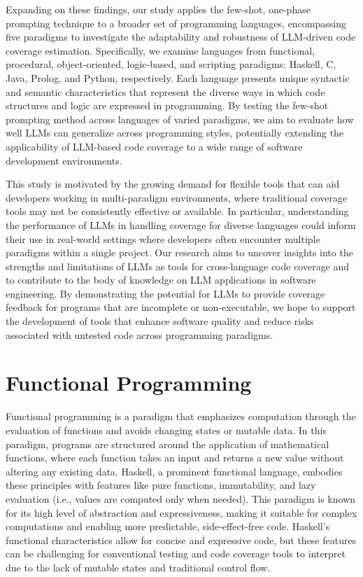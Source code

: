 \documentclass[sigconf]{acmart}
\begin{document}
Expanding on these findings, our study applies the few-shot, one-phase prompting technique to a broader set of programming languages, encompassing five paradigms to investigate the adaptability and robustness of LLM-driven code coverage estimation. Specifically, we examine languages from functional, procedural, object-oriented, logic-based, and scripting paradigms: Haskell, C, Java, Prolog, and Python, respectively. Each language presents unique syntactic and semantic characteristics that represent the diverse ways in which code structures and logic are expressed in programming. By testing the few-shot prompting method across languages of varied paradigms, we aim to evaluate how well LLMs can generalize across programming styles, potentially extending the applicability of LLM-based code coverage to a wide range of software development environments.

This study is motivated by the growing demand for flexible tools that can aid developers working in multi-paradigm environments, where traditional coverage tools may not be consistently effective or available. In particular, understanding the performance of LLMs in handling coverage for diverse languages could inform their use in real-world settings where developers often encounter multiple paradigms within a single project. Our research aims to uncover insights into the strengths and limitations of LLMs as tools for cross-language code coverage and to contribute to the body of knowledge on LLM applications in software engineering. By demonstrating the potential for LLMs to provide coverage feedback for programs that are incomplete or non-executable, we hope to support the development of tools that enhance software quality and reduce risks associated with untested code across programming paradigms.

\section{Functional Programming}
Functional programming is a paradigm that emphasizes computation through the evaluation of functions and avoids changing states or mutable data. In this paradigm, programs are structured around the application of mathematical functions, where each function takes an input and returns a new value without altering any existing data. Haskell, a prominent functional language, embodies these principles with features like pure functions, immutability, and lazy evaluation (i.e., values are computed only when needed). This paradigm is known for its high level of abstraction and expressiveness, making it suitable for complex computations and enabling more predictable, side-effect-free code. Haskell’s functional characteristics allow for concise and expressive code, but these features can be challenging for conventional testing and code coverage tools to interpret due to the lack of mutable states and traditional control flow.
\end{document}
